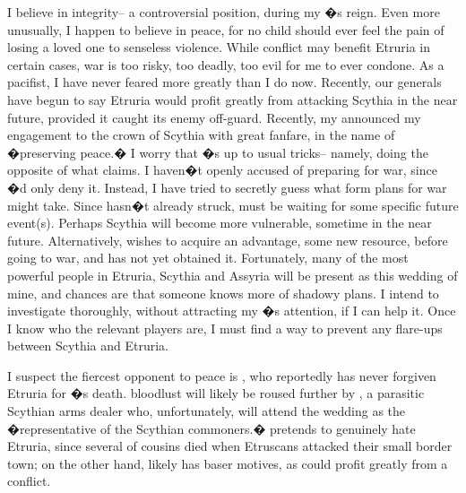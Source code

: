 \documentclass[char]{Kos}
\begin{document}
I believe in integrity-- a controversial position, during my \cEtruriaKing{\parent}�s reign. Even more unusually, I happen to believe in peace, for no child should ever feel the pain of losing a loved one to senseless violence. While conflict may benefit Etruria in certain cases, war is too risky, too deadly, too evil for me to ever condone. As a pacifist, I have never feared more greatly than I do now. Recently, our generals have begun to say Etruria would profit greatly from attacking Scythia in the near future, provided it caught its enemy off-guard. Recently, my \cEtruriaKing{\parent} announced my engagement to the crown \cBride{\prince} of Scythia with great fanfare, in the name of �preserving peace.� I worry that \cEtruriaKing{\Parent}�s up to \cEtruriaKing{\their} usual tricks-- namely, doing the opposite of what \cEtruriaKing{\they} claims. I haven�t openly accused \cEtruriaKing{\them} of preparing for war, since \cEtruriaKing{\they}�d only deny it. Instead, I have tried to secretly guess what form \cEtruriaKing{\their} plans for war might take. Since \cEtruriaKing{\they} hasn�t already struck, \cEtruriaKing{\They} must be waiting for some specific future event(s). Perhaps Scythia will become more vulnerable, sometime in the near future. Alternatively, \cEtruriaKing{\they} wishes to acquire an advantage, some new resource, before going to war, and \cEtruriaKing{\they} has not yet obtained it. Fortunately, many of the most powerful people in Etruria, Scythia and Assyria will be present as this wedding of mine, and chances are that someone knows more of \cEtruriaKing{\their} shadowy plans. I intend to investigate thoroughly, without attracting my \cEtruriaKing{\parent}�s attention, if I can help it. Once I know who the relevant players are, I must find a way to prevent any flare-ups between Scythia and Etruria.

I suspect the fiercest opponent to peace is \cScythiaQueen{\Monarch} \cScythiaQueen{\nickname}, who reportedly has never forgiven Etruria for \cFugitive{\nickname}�s death. \cScythiaQueen{\Their} bloodlust will likely be roused further by \cArmsDealer{\name}, a parasitic Scythian arms dealer who, unfortunately, will attend the wedding as the �representative of the Scythian commoners.� \cArmsDealer{\They} pretends to genuinely hate Etruria, since several of \cArmsDealer{\their} cousins died when Etruscans attacked their small border town; on the other hand, \cArmsDealer{\they} likely has baser motives, as \cArmsDealer{\they} could profit greatly from a conflict. 
\end{document}
